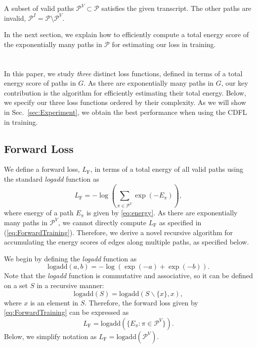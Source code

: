\documentclass[10pt,twocolumn,letterpaper]{article}
\begin{document}
A subset of valid paths $\mathcal{P}^V\subset \mathcal{P}$ satisfies the given transcript. The other paths are invalid, $\mathcal{P}^I= \mathcal{P}\setminus \mathcal{P}^V$.

In the next section, we explain how to efficiently compute a total energy score of the exponentially many paths in $\mathcal{P}$ for estimating our loss in training.




\section{\model}\label{sec:CDFL}

In this paper, we study {\em three} distinct loss functions, defined in terms of a total energy score of paths in $G$. As there are exponentially many paths in $G$, our key contribution is the algorithm for efficiently estimating their total energy.  Below, we specify our three loss functions ordered by their complexity. As we will show in Sec.~\ref{sec:Experiment}, we obtain the best performance when using the CDFL in training.


\subsection{Forward Loss}

We define a forward loss,  $L_\text{F}$, in terms of a total energy of all valid paths using the standard {\em logadd} function as
\begin{equation}\label{eq:ForwardTraining}
L_\text{F} = -\log(\sum_{\pi\in\mathcal{P}^V}\exp(-E_{\pi})),
\end{equation}
where energy of a path $E_{\pi}$ is given by \eqref{eq:energy}. As there are exponentially many paths in $\mathcal{P}^V$, we cannot directly compute $L_\text{F}$ as specified in (\ref{eq:ForwardTraining}).  Therefore, we derive a novel recursive algorithm for accumulating the energy scores of edges along multiple paths, as specified below.

We begin by defining the {\em logadd} function as
\begin{equation}
    \text{logadd}(a,b) = -\log(\exp(-a) + \exp(-b)).
\end{equation}
Note that the {\em logadd} function is commutative and associative, so  it can be defined on  a set $S$ in a recursive manner:
\begin{equation}
    \text{logadd}(S) = \text{logadd}(S\backslash  \{x\}, x),
\end{equation}
where $x$ is an element in $S$.
Therefore, the forward loss given by \eqref{eq:ForwardTraining} can be expressed as
\begin{equation}
L_\text{F} = \text{logadd}(\{E_{\pi}:\pi \in \mathcal{P}^V\}).
\end{equation}
Below, we simplify notation as $L_\text{F} = \text{logadd}(\mathcal{P}^V)$.
\end{document}
